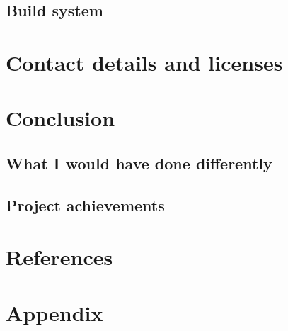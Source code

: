 \documentclass	[a4paper, 10pt]	{article}
\begin{document}
    \subsection{Build system}

  \section{Contact details and licenses}
  \section{Conclusion}
    \subsection{What I would have done differently}
    \subsection{Project achievements}
  \section{References}
  \section{Appendix}
\end{document}

